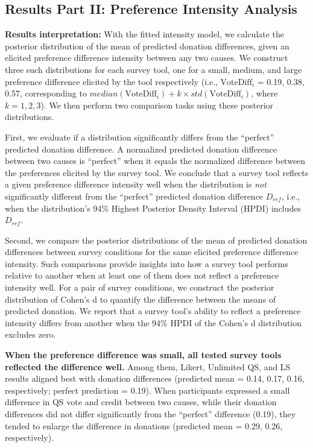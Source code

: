 \subsection{Results Part II: Preference Intensity Analysis}
\label{sec:result_2}

\textbf{Results interpretation:} With the fitted intensity model, we calculate the posterior distribution of the mean of predicted donation differences, given an elicited preference difference intensity between any two causes. We construct three such distributions for each survey tool, one for a small, medium, and large preference difference elicited by the tool respectively (i.e., $\text{VoteDiff}_i$ = 0.19, 0.38, 0.57, corresponding to $median(\text{VoteDiff}_i)+k \times std(\text{VoteDiff}_i)$, where $k=1, 2, 3$). We then perform two comparison tasks using these posterior distributions. 

First, we evaluate if a distribution significantly differs from the ``perfect'' predicted donation difference. A normalized predicted donation difference between two causes is ``perfect'' when it equals the normalized difference between the preferences elicited by the survey tool. We conclude that a survey tool reflects a given preference difference intensity well when the distribution is \textit{not} significantly different from the ``perfect'' predicted donation difference $D_{ref}$, i.e., when the distribution's 94\% Highest Posterior Density Interval (HPDI) includes $D_{ref}$.

Second, we compare the posterior distributions of the mean of predicted donation differences between survey conditions for the same elicited preference difference intensity. Such comparisons provide insights into how a survey tool performs relative to another when at least one of them does not reflect a preference intensity well. For a pair of survey conditions, we construct the posterior distribution of Cohen's d to quantify the difference between the means of predicted donation. We report that a survey tool's ability to reflect a preference intensity differs from another when the 94\% HPDI of the Cohen's d distribution excludes zero. 

\textbf{When the preference difference was small, all tested survey tools reflected the difference well.} Among them, Likert, Unlimited QS, and LS results aligned best with donation differences (predicted mean = 0.14, 0.17, 0.16, respectively; perfect prediction = 0.19). When participants expressed a small difference in QS vote and credit between two causes, while their donation differences did not differ significantly from the ``perfect'' difference (0.19), they tended to enlarge the difference in donations (predicted mean = 0.29, 0.26, respectively). 


